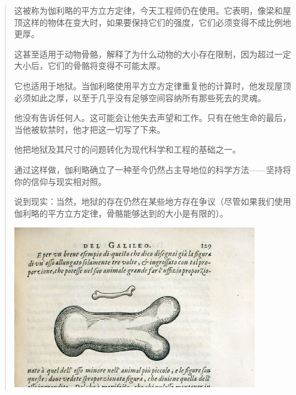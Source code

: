 \begin{quote}
    这被称为伽利略的平方立方定律，今天工程师仍在使用。它表明，像梁和屋顶这样的物体在变大时，如果要保持它们的强度，它们必须变得不成比例地更厚。
    
    这甚至适用于动物骨骼，解释了为什么动物的大小存在限制，因为超过一定大小后，它们的骨骼将变得不可能太厚。
    
    它也适用于地狱。当伽利略使用平方立方定律重复他的计算时，他发现屋顶必须如此之厚，以至于几乎没有足够空间容纳所有那些死去的灵魂。
    
    他没有告诉任何人。这可能会让他失去声望和工作。只有在他生命的最后，当他被软禁时，他才把这一切写了下来。
    
    他把地狱及其尺寸的问题转化为现代科学和工程的基础之一。
    
    通过这样做，伽利略确立了一种至今仍然占主导地位的科学方法——坚持将你的信仰与现实相对照。
    
    说到现实：当然，地狱的存在仍然在某些地方存在争议（尽管如果我们使用伽利略的平方立方定律，骨骼能够达到的大小是有限的）。

    \begin{center}
        \includegraphics[height=200pt]{assets/The_Bone_in_Square-Cube_law.png}
    \end{center}
\end{quote}
